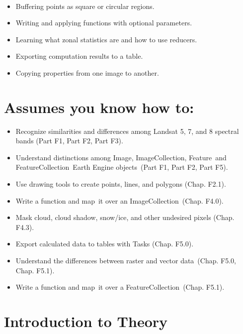 \documentclass[
  letterpaper,
  DIV=11,
  numbers=noendperiod]{scrreprt}
\providecommand{\tightlist}{%
  \setlength{\itemsep}{0pt}\setlength{\parskip}{0pt}}\usepackage{longtable,booktabs,array}
\begin{document}

~

\begin{itemize}
\tightlist
\item
  Buffering points as square or circular regions.
\item
  Writing and applying functions with optional parameters.
\item
  Learning what zonal statistics are and how to use reducers.
\item
  Exporting computation results to a table.
\item
  Copying properties from one image to another.
\end{itemize}

\hypertarget{assumes-you-know-how-to-18}{%
\section*{Assumes you know how to:}\label{assumes-you-know-how-to-18}}


\begin{itemize}
\tightlist
\item
  Recognize similarities and differences among Landsat 5, 7, and 8
  spectral bands (Part F1, Part F2, Part F3).
\item
  Understand distinctions among Image, ImageCollection, Feature~and
  FeatureCollection~Earth Engine objects~(Part F1, Part F2, Part F5).
\item
  Use drawing tools to create points, lines, and polygons (Chap. F2.1).
\item
  Write a function and map~it over an ImageCollection~(Chap. F4.0).
\item
  Mask cloud, cloud shadow, snow/ice, and other undesired pixels (Chap.
  F4.3).
\item
  Export calculated data to tables with Tasks (Chap. F5.0).
\item
  Understand the differences between raster and vector data~(Chap. F5.0,
  Chap. F5.1).
\item
  Write a function and map~it over a FeatureCollection~(Chap. F5.1).
\end{itemize}

\hypertarget{introduction-to-theory-13}{%
\section{Introduction to Theory~}\label{introduction-to-theory-13}}
\end{document}
